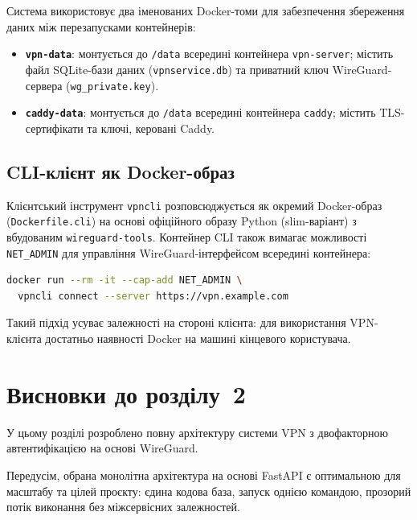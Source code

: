 Система використовує два іменованих Docker-томи для забезпечення
збереження даних між перезапусками контейнерів:

\begin{itemize}
  \item \textbf{\texttt{vpn-data}}: монтується до \texttt{/data}
    всередині контейнера \texttt{vpn-server}; містить файл SQLite-бази
    даних (\texttt{vpnservice.db}) та приватний ключ WireGuard-сервера
    (\texttt{wg\_private.key}).

  \item \textbf{\texttt{caddy-data}}: монтується до \texttt{/data}
    всередині контейнера \texttt{caddy}; містить TLS-сертифікати
    та ключі, керовані Caddy.
\end{itemize}

\subsection{CLI-клієнт як Docker-образ}

Клієнтський інструмент \texttt{vpncli} розповсюджується як окремий
Docker-образ (\texttt{Dockerfile.cli}) на основі офіційного образу Python (slim-варіант)
з вбудованим \texttt{wireguard-tools}. Контейнер CLI також вимагає
можливості \texttt{NET\_ADMIN} для управління WireGuard-інтерфейсом
всередині контейнера:

\begin{lstlisting}[language=bash, caption={Запуск CLI-клієнта у Docker-контейнері},
                   label={lst:cli_docker}]
docker run --rm -it --cap-add NET_ADMIN \
  vpncli connect --server https://vpn.example.com
\end{lstlisting}

Такий підхід усуває залежності на стороні клієнта: для використання
VPN-клієнта достатньо наявності Docker на машині кінцевого користувача.

\section{Висновки до розділу~2}
\label{sec:chapter2_conclusions}

У цьому розділі розроблено повну архітектуру системи VPN
з двофакторною автентифікацією на основі WireGuard.

Передусім, обрана монолітна архітектура на основі FastAPI є оптимальною
для масштабу та цілей проєкту: єдина кодова база, запуск однією командою,
прозорий потік виконання без міжсервісних залежностей.


